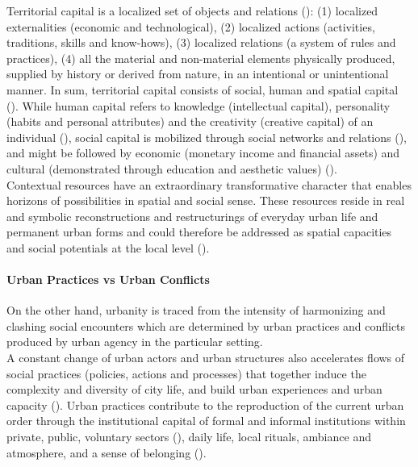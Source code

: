 \documentclass[11pt]{report}
\begin{document}
{{{Territorial capital is a localized set of objects and relations (\href{Camagni}{\citealt{camagni_regional_2013}}):
(1) localized externalities (economic and technological),
(2) localized actions (activities, traditions, skills and know-hows),
(3) localized relations (a system of rules and practices),
(4) all the material and non-material elements physically produced, supplied by history or derived from nature, in an intentional or unintentional manner. In sum, territorial capital consists of social, human and spatial capital  (\href{Gronlund}{\citealt{gronlund_notions_2007}}).
While human capital refers to knowledge (intellectual capital), personality (habits and personal attributes) and the creativity (creative capital) of an individual (\href{Becker}{\citealt{becker_human_1993}}), social capital is mobilized through social networks and relations (\citealt{Bourdieu 1986}), and might be followed by economic (monetary income and  financial  assets) and cultural (demonstrated through education and aesthetic values) (\citealt{Rerat and Lees 2011}).
\\

Contextual resources have an extraordinary transformative character that enables horizons of possibilities in spatial and social sense.
These resources reside in real and symbolic reconstructions and restructurings of everyday urban life and permanent urban forms and could therefore be addressed as spatial capacities and social potentials at the local level (\href{Swyngedouw}{\citealt{swyngedouw_glocal_2003}}).

\paragraph{Urban Practices vs Urban Conflicts}

On the other hand, urbanity is traced from the intensity of harmonizing and clashing social encounters which are determined by urban practices and conflicts produced by urban agency in the particular setting. 
\\

A constant change of urban actors and urban structures also accelerates flows of social practices (policies, actions and processes) that together induce the complexity and diversity of city life, and build urban experiences and urban capacity (\href{Robinson}{\citealt{robinson_ordinary_2006}}).
Urban practices contribute to the reproduction of the current urban order through the institutional capital of formal and informal institutions within private, public, voluntary sectors (\href{Vujosevic}{\citealt{vujosevic_regionalizam_2015}}), daily life, local rituals, ambiance and atmosphere, and a sense of belonging (\href{ref}{\citealt{volic_belgrade_2012}}).
\\

}}}
\end{document}
